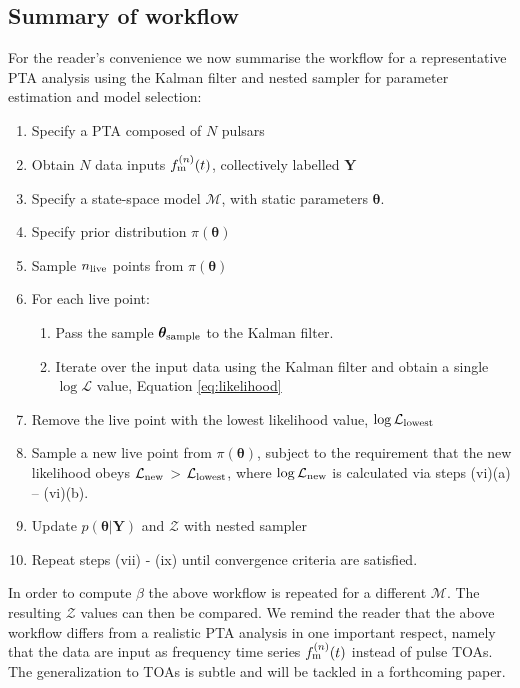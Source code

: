 \documentclass[fleqn,usenatbib,useAMS]{mnras}
\begin{document}
\subsection{Summary of workflow}\label{sec:methodsummary}
For the reader's convenience we now summarise the workflow for a representative PTA analysis using the Kalman filter and nested sampler for parameter estimation and model selection:
\begin{enumerate}[leftmargin=2em]
	\item Specify a PTA composed of $N$ pulsars 
	\item Obtain $N$ data inputs $f_{\rm m}^{(n)}(t)$, collectively labelled $\boldsymbol{Y}$
	\item Specify a state-space model $\mathcal{M}$, with static parameters $\boldsymbol{\theta}$. 
	\item Specify prior distribution $\pi(\boldsymbol{\theta})$
	 \item Sample $n_{\rm live}$ points from $\pi(\boldsymbol{\theta})$ 
	 \item For each live point:
\begin{enumerate}[leftmargin=2em]
	\item Pass the sample $\boldsymbol{\theta}_{\rm sample}$ to the Kalman filter.
	\item Iterate over the input data using the Kalman filter and obtain a single $\log \mathcal{L}$ value, Equation \eqref{eq:likelihood}
\end{enumerate}
	\item Remove the live point with the lowest likelihood value, $\log \mathcal{L}_{\rm lowest}$
	\item Sample a new live point from $\pi(\boldsymbol{\theta})$, subject to the requirement that the new likelihood obeys $\mathcal{L}_{\rm new}$ > $\mathcal{L}_{\rm lowest}$, where  $\log \mathcal{L}_{\rm new}$ is calculated via steps (vi)(a) -- (vi)(b).
	\item Update $p\left(\boldsymbol{\theta}|\boldsymbol{Y}\right)$ and $\mathcal{Z}$ with nested sampler
	\item Repeat steps (vii) - (ix) until convergence criteria are satisfied.
\end{enumerate}
In order to compute $\beta$ the above workflow is repeated for a different $\mathcal{M}$. The resulting $\mathcal{Z}$ values can then be compared. We remind the reader that the above workflow differs from a realistic PTA analysis in one important respect, namely that the data are input as frequency time series $f_{\rm m}^{(n)}(t)$ instead of pulse TOAs. The generalization to TOAs is subtle and will be tackled in a forthcoming paper.
\end{document}
